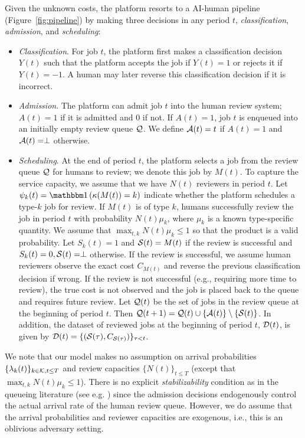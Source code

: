 Given the unknown costs, the platform resorts to a AI-human pipeline (Figure~\ref{fig:pipeline}) by making three decisions in any period $t$, \emph{classification}, \emph{admission}, and \emph{scheduling}:
\begin{itemize}
\item \emph{Classification}. For job $t$, the platform first makes a classification decision $Y(t)$ such that the platform accepts the job if $Y(t) = 1$ or rejects it if $Y(t) = -1$. A human may later reverse this classification decision if it is incorrect.
\item \emph{Admission}. The platform can admit job $t$ into the human review system; $A(t) = 1$ if it is admitted and $0$ if not. If $A(t) = 1$, job $t$ is enqueued into an initially empty review queue $\mathcal{Q}$. We define $\mathcal{A}(t) = t$ if $A(t) = 1$ and $\mathcal{A}(t) = \perp$ otherwise.
\item \emph{Scheduling}. At the end of period $t$, the platform selects a job from the review queue $\mathcal{Q}$ for humans to review; we denote this job by $M(t)$. To capture the service capacity, we assume that we have $N(t)$ reviewers in period $t$. Let $\psi_k(t) = \indic{\kappa(M(t)) = k}$ indicate whether the platform schedules a type-$k$ job for review. If $M(t)$ is of type $k$, humans successfully review the job in period $t$ with probability $N(t)\mu_k$, where $\mu_k$ is a known type-specific quantity. We assume that $\max_{t,k} N(t)\mu_k \leq 1$ so that the product is a valid probability. Let $S_k(t) = 1$ and $\mathcal{S}(t) = M(t)$ if the review is successful and $S_k(t) = 0, \mathcal{S}(t) = \perp$ otherwise. If the review is successful, we assume human reviewers observe the exact cost $C_{M(t)}$ and reverse the previous classification decision if wrong. If the review is not successful (e.g., requiring more time to review), the true cost is not observed and the job is placed back to the queue and requires future review. Let $\mathcal{Q}(t)$ be the set of jobs in the review queue at the beginning of period $t$. Then $\mathcal{Q}(t+1) = \mathcal{Q}(t) \cup \{\mathcal{A}(t)\} \setminus \{\mathcal{S}(t)\}$. In addition, the dataset of reviewed jobs at the beginning of period $t$, $\mathcal{D}(t)$, is given by $\mathcal{D}(t) = \{(\mathcal{S}(\tau), C_{\mathcal{S}(\tau)})\}_{\tau < t}$.
\end{itemize}

We note that our model makes no assumption on arrival probabilities $\{\lambda_k(t)\}_{k \in \mathcal{K}, t \leq T}$ and review capacities $\{N(t)\}_{t \leq T}$ (except that $\max_{t,k} N(t)\mu_k \leq 1$). There is no explicit \emph{stabilizability} condition as in the queueing literature (see e.g. \cite{yang2023learning}) since the admission decisions endogenously control the actual arrival rate of the human review queue. However, we do assume that the arrival probabilities and reviewer capacities are exogenous, i.e., this is an oblivious adversary setting.


